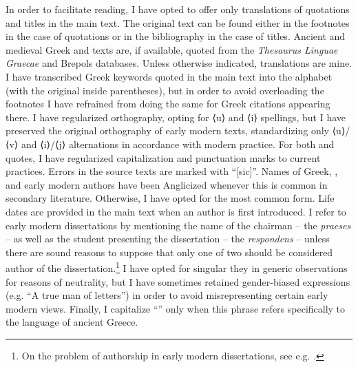 \hypertarget{Toc19704800}{}
In order to facilitate reading, I have opted to offer only  translations of quotations and titles in the main text. The original text can be found either in the footnotes in the case of quotations or in the bibliography in the case of titles. Ancient and medieval Greek and  texts are, if available, quoted from the \textit{Thesaurus Linguae Graecae} and Brepols databases. Unless otherwise indicated, translations are mine. I have transcribed Greek keywords quoted in the main text into the  alphabet (with the original inside parentheses), but in order to avoid overloading the footnotes I have refrained from doing the same for Greek citations appearing there. I have regularized  orthography, opting for ⟨u⟩ and ⟨i⟩ spellings, but I have preserved the original orthography of early modern  texts, standardizing only ⟨u⟩/⟨v⟩ and ⟨i⟩/⟨j⟩ alternations in accordance with modern practice. For both  and  quotes, I have regularized capitalization and punctuation marks to current practices. Errors in the source texts are marked with “[sic]”. Names of Greek, , and early modern authors have been Anglicized whenever this is common in secondary literature. Otherwise, I have opted for the most common form. Life dates are provided in the main text when an author is first introduced. I refer to early modern dissertations by mentioning the name of the chairman – the \textit{praeses} – as well as the student presenting the dissertation – the \textit{respondens} – unless there are sound reasons to suppose that only one of two should be considered author of the dissertation.\footnote{On the problem of authorship in early modern dissertations, see e.g. \citet{Considine2008b}.} I have opted for singular they in generic observations for reasons of neutrality, but I have sometimes retained gender-biased expressions (e.g. “A true man of letters”) in order to avoid misrepresenting certain early modern views. Finally, I capitalize “” only when this phrase refers specifically to the language of ancient Greece.
